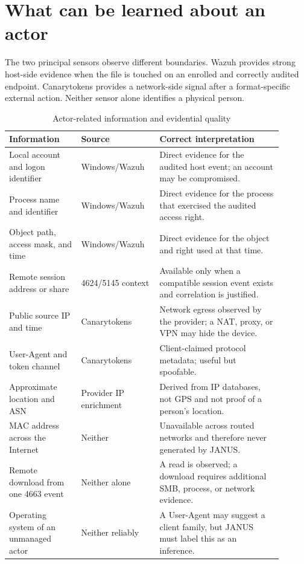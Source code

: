 \section{What can be learned about an actor}

The two principal sensors observe different boundaries. Wazuh provides strong
host-side evidence when the file is touched on an enrolled and correctly
audited endpoint. Canarytokens provides a network-side signal after a
format-specific external action. Neither sensor alone identifies a physical
person.

\begin{table}[H]
\centering
\caption{Actor-related information and evidential quality}
\label{tab:actor-evidence}
\small
\begin{tabular}{p{0.24\linewidth}p{0.25\linewidth}p{0.41\linewidth}}
\toprule
Information & Source & Correct interpretation \\
\midrule
Local account and logon identifier & Windows/Wazuh & Direct evidence for the
audited host event; an account may be compromised. \\
Process name and identifier & Windows/Wazuh & Direct evidence for the process
that exercised the audited access right. \\
Object path, access mask, and time & Windows/Wazuh & Direct evidence for the
object and right used at that time. \\
Remote session address or share & 4624/5145 context & Available only when a
compatible session event exists and correlation is justified. \\
Public source IP and time & Canarytokens & Network egress observed by the
provider; a NAT, proxy, or VPN may hide the device. \\
User-Agent and token channel & Canarytokens & Client-claimed protocol metadata;
useful but spoofable. \\
Approximate location and ASN & Provider IP enrichment & Derived from IP
databases, not GPS and not proof of a person's location. \\
MAC address across the Internet & Neither & Unavailable across routed networks
and therefore never generated by JANUS. \\
Remote download from one 4663 event & Neither alone & A read is observed; a
download requires additional SMB, process, or network evidence. \\
Operating system of an unmanaged actor & Neither reliably & A User-Agent may
suggest a client family, but JANUS must label this as an inference. \\
\bottomrule
\end{tabular}
\end{table}

